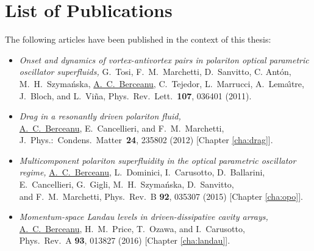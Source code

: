 \chapter*{List of Publications}

The following articles have been published in the context of this thesis:

\begin{itemize}



\item

  \emph{Onset and dynamics of vortex-antivortex pairs in polariton optical parametric oscillator superfluids,}
  G.~Tosi, F.~M.~Marchetti, D.~Sanvitto, C. Ant\'{o}n, M.~H.~Szyma\'{n}ska, \underline{A.~C.~Berceanu}, C.~Tejedor, L.~Marrucci, A.~Lema\^{\i}tre, J.~Bloch, and L.~Vi\~{n}a,
  Phys.\ Rev.\ Lett.\ \textbf{107}, 036401 (2011).

\item

  \emph{Drag in a resonantly driven polariton fluid,}\\
  \underline{A.~C.~Berceanu}, E.~Cancellieri, and F.~M.~Marchetti,\\
  J.\ Phys.:\ Condens.\ Matter\ \textbf{24}, 235802 (2012) [Chapter \ref{cha:drag}].

\item

  \emph{Multicomponent polariton superfluidity in the optical parametric oscillator regime,}
  \underline{A.~C.~Berceanu}, L.~Dominici, I.~Carusotto, D.~Ballarini,\\
  E.~Cancellieri, G.~Gigli, M.~H.~Szyma\'{n}ska, D.~Sanvitto,\\ and F.~M.~Marchetti,
  Phys.\ Rev.\ B \textbf{92}, 035307 (2015) [Chapter \ref{cha:opo}].

\item

  \emph{Momentum-space Landau levels in driven-dissipative cavity arrays,}\\
  \underline{A.~C.~Berceanu}, H.~M.~Price, T.~Ozawa, and I.~Carusotto,\\
  Phys.\ Rev.\ A \textbf{93}, 013827 (2016) [Chapter \ref{cha:landau}].

\end{itemize}

